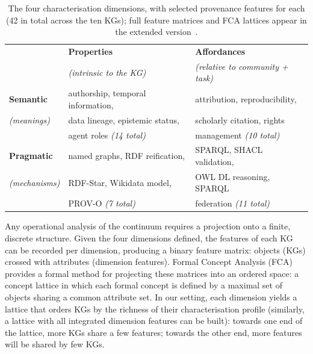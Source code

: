 \documentclass[runningheads]{llncs}
\newenvironment{onlyshort}{\ignorespaces}{\ignorespacesafterend}
\begin{document}
\begin{onlyshort}
\begin{table}[t]
\centering
\small
\caption{The four characterisation dimensions, with selected provenance features for each (42 in total across the ten KGs); full feature matrices and FCA lattices appear in the extended version~\cite{continuumex}.}\vspace{-0.2cm}
\label{tab:provenance-summary}
\begin{tabular}{@{}l l l@{}}
\toprule
 & \textbf{Properties} & \textbf{Affordances} \\
 & \footnotesize\textit{(intrinsic to the KG)} & \footnotesize\textit{(relative to community + task)} \\
\midrule
\textbf{Semantic}  & authorship, temporal information,   & attribution, reproducibility, \\
\footnotesize\textit{(meanings)}
                   & data lineage, epistemic status,     & scholarly citation, rights \\
                   & agent roles \emph{(14 total)}       & management \emph{(10 total)} \\
\addlinespace
\textbf{Pragmatic} & named graphs, RDF reification,      & SPARQL, SHACL validation, \\
\footnotesize\textit{(mechanisms)}
                   & RDF-Star, Wikidata model,           & OWL DL reasoning, SPARQL \\
                   & PROV-O \emph{(7 total)}             & federation \emph{(11 total)} \\
\bottomrule
\end{tabular}\vspace{{-0.3cm}}
\end{table}
\end{onlyshort}

\begin{onlyshort}
Any operational analysis of the continuum requires a projection onto 
a finite, discrete structure. Given the four dimensions defined, 
the features of each KG can be recorded per dimension, producing a 
binary feature matrix: objects (KGs) crossed with attributes 
(dimension features). Formal Concept Analysis 
(FCA)~\cite{ganter1999formal} provides a formal method for 
projecting these matrices into an ordered space: a 
concept lattice in which each formal concept is defined by a 
maximal set of objects sharing a common attribute set. 
In our setting, each dimension yields a lattice that orders KGs by the richness of their characterisation profile (similarly, a lattice with all integrated dimension features can be built): towards one end of the lattice, more KGs share a few features; towards the other end, more features will be shared by few KGs.
\end{onlyshort}
\end{document}
